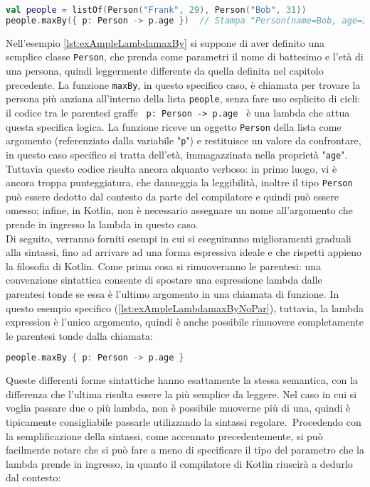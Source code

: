 \begin{lstlisting}[caption={La funzione \texttt{maxBy}}, captionpos=b, label={lst:exAmpleLambdamaxBy}, language=Kotlin]
val people = listOf(Person("Frank", 29), Person("Bob", 31))
people.maxBy({ p: Person -> p.age })  // Stampa "Person(name=Bob, age=31)"
\end{lstlisting}

Nell'esempio \ref{lst:exAmpleLambdamaxBy} si suppone di aver definito una semplice classe \texttt{Person}, che prenda come parametri il nome di battesimo e l'età di una persona, quindi leggermente differente da quella definita nel capitolo precedente. La funzione \texttt{maxBy}, in questo specifico caso, è chiamata per trovare la persona più anziana all’interno della lista \texttt{people}, senza fare uso esplicito di cicli: il codice tra le parentesi graffe \texttt{{ p: Person -> p.age }} è una lambda che attua questa specifica logica. La funzione riceve un oggetto \texttt{Person} della lista come argomento (referenziato dalla variabile "\texttt{p}") e restituisce un valore da confrontare, in questo caso specifico si tratta dell'età, immagazzinata nella proprietà "\texttt{age}". Tuttavia questo codice risulta ancora alquanto verboso: in primo luogo, vi è ancora troppa punteggiatura, che danneggia la leggibilità, inoltre il tipo \texttt{Person} può essere dedotto dal contesto da parte del compilatore e quindi può essere omesso; infine, in Kotlin, non è necessario assegnare un nome all'argomento che prende in ingresso la lambda in questo caso.\\
Di seguito, verranno forniti esempi in cui si eseguiranno miglioramenti graduali alla sintassi, fino ad arrivare ad una forma espressiva ideale e che rispetti appieno la filosofia di Kotlin. Come prima cosa si rimuoveranno le parentesi: una convenzione sintattica consente di spostare una espressione lambda dalle parentesi tonde se essa è l'ultimo argomento in una chiamata di funzione. In questo esempio specifico (\ref{lst:exAmpleLambdamaxByNoPar}), tuttavia, la lambda expression è l'unico argomento, quindi è anche possibile rimuovere completamente le parentesi tonde dalla chiamata:\\

\begin{lstlisting}[caption={Rimozione delle parentesi tonde}, captionpos=b, label={lst:exAmpleLambdamaxByNoPar}, language=Kotlin]
people.maxBy { p: Person -> p.age }
\end{lstlisting}

Queste differenti forme sintattiche hanno esattamente la stessa semantica, con la differenza che l'ultima risulta essere la più semplice da leggere. Nel caso in cui si voglia passare due o più lambda, non è possibile muoverne più di una, quindi è tipicamente consigliabile passarle utilizzando la sintassi regolare.\
Procedendo con la semplificazione della sintassi, come accennato precedentemente, si può facilmente notare che si può fare a meno di specificare il tipo del parametro che la lambda prende in ingresso, in quanto il compilatore di Kotlin riuscirà a dedurlo dal contesto:\\

